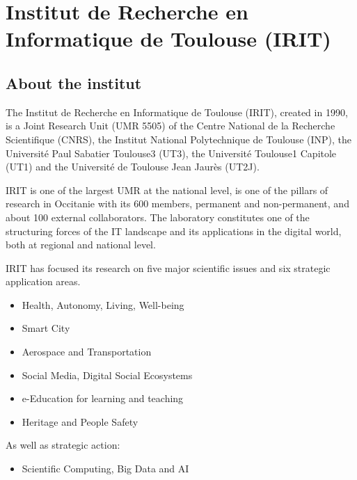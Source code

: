 \documentclass[
  a4paper, xcolor = usenames,dvipsnames]{article}
\providecommand{\tightlist}{%
  \setlength{\itemsep}{0pt}\setlength{\parskip}{0pt}}
\theoremstyle{definition}
\theoremstyle{definition}
\theoremstyle{definition}
\theoremstyle{definition}
\theoremstyle{remark}
\begin{document}
\newpage


\hypertarget{institut-de-recherche-en-informatique-de-toulouse-irit}{%
\section{Institut de Recherche en Informatique de Toulouse (IRIT)}\label{institut-de-recherche-en-informatique-de-toulouse-irit}}

\hypertarget{about-the-institut}{%
\subsection{About the institut}\label{about-the-institut}}

The Institut de Recherche en Informatique de Toulouse (IRIT), created in 1990, is a Joint Research Unit (UMR 5505) of the Centre National de la Recherche Scientifique (CNRS), the Institut National Polytechnique de Toulouse (INP), the Université Paul Sabatier Toulouse3 (UT3), the Université Toulouse1 Capitole (UT1) and the Université de Toulouse Jean Jaurès (UT2J).

IRIT is one of the largest UMR at the national level, is one of the pillars of research in Occitanie with its 600 members, permanent and non-permanent, and about 100 external collaborators. The laboratory constitutes one of the structuring forces of the IT landscape and its applications in the digital world, both at regional and national level.

IRIT has focused its research on five major scientific issues and six strategic application areas.

\begin{itemize}
\tightlist
\item
  Health, Autonomy, Living, Well-being
\item
  Smart City
\item
  Aerospace and Transportation
\item
  Social Media, Digital Social Ecosystems
\item
  e-Education for learning and teaching
\item
  Heritage and People Safety
\end{itemize}

As well as strategic action:

\begin{itemize}
\tightlist
\item
  Scientific Computing, Big Data and AI
\end{itemize}
\end{document}
